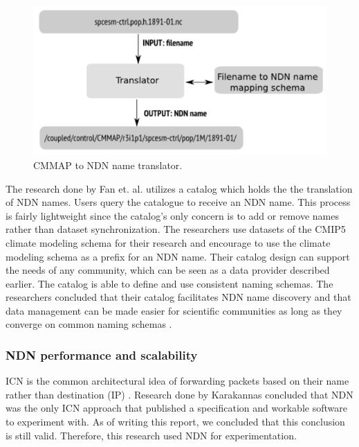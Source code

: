 \begin{figure}[H]
\centering
\includegraphics[scale=0.4]{Images/cmip2ndn.png}
\caption{CMMAP to NDN name translator.}
\label{fig:cmmap_ndnn}
\end{figure}

The research done by Fan et. al. utilizes a catalog which holds the the translation of NDN names. Users query the catalogue to receive an NDN name. This process is fairly lightweight since the catalog's only concern is to add or remove names rather than dataset synchronization. The researchers use datasets of the CMIP5 climate modeling schema for their research and encourage to use the climate modeling schema as a prefix for an NDN name. 
Their catalog design can support the needs of any community, which can be seen as a data provider described earlier. The catalog is able to define and use consistent naming schemas.
The researchers concluded that their catalog facilitates NDN name discovery and that data management can be made easier for scientific communities as long as they converge on common naming schemas \cite{ndn-man}. 

\subsubsection{NDN performance and scalability}
\label{introduction-related-work-ndn}
ICN is the common architectural idea of forwarding packets based on their name rather than destination (IP) \cite{jacobson2009networking}. Research done by Karakannas \cite{icn-bd} concluded that NDN was the only ICN approach that published a specification and workable software to experiment with. As of writing this report, we concluded that this conclusion is still valid. Therefore, this research used NDN for experimentation.

